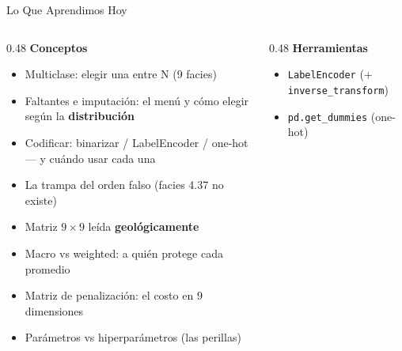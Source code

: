 \documentclass[aspectratio=169, 11pt]{beamer}
\begin{document}
\begin{frame}[shrink=8]{Lo Que Aprendimos Hoy}
  \vspace{-4pt}
  \begin{columns}[T]
    \begin{column}{0.48\textwidth}
      {\footnotesize\color{arcaDark}\bfseries Conceptos}
      \vspace{3pt}
      {\footnotesize\color{textMuted}
      \begin{itemize}\setlength{\itemsep}{2pt}
        \item[{\color{codeGreen}\scriptsize\faCheck}]
          Multiclase: elegir una entre N (9 facies)
        \item[{\color{codeGreen}\scriptsize\faCheck}]
          Faltantes e imputación: el menú y cómo elegir
          según la \textbf{distribución}
        \item[{\color{codeGreen}\scriptsize\faCheck}]
          Codificar: binarizar / LabelEncoder / one-hot ---
          y cuándo usar cada una
        \item[{\color{codeGreen}\scriptsize\faCheck}]
          La trampa del orden falso (facies 4.37 no existe)
        \item[{\color{codeGreen}\scriptsize\faCheck}]
          Matriz \(9\times9\) leída \textbf{geológicamente}
        \item[{\color{codeGreen}\scriptsize\faCheck}]
          Macro vs weighted: a quién protege cada promedio
        \item[{\color{codeGreen}\scriptsize\faCheck}]
          Matriz de penalización: el costo en 9 dimensiones
        \item[{\color{codeGreen}\scriptsize\faCheck}]
          Parámetros vs hiperparámetros (las perillas)
      \end{itemize}
      }
    \end{column}
    \begin{column}{0.48\textwidth}
      {\footnotesize\color{arcaDark}\bfseries Herramientas}
      \vspace{3pt}
      {\footnotesize\color{textMuted}
      \begin{itemize}\setlength{\itemsep}{2pt}
        \item[{\color{arcaRed}\scriptsize\faTools}]
          \texttt{LabelEncoder} (+ \texttt{inverse\_transform})
        \item[{\color{arcaRed}\scriptsize\faTools}]
          \texttt{pd.get\_dummies} (one-hot)

\end{itemize}}
\end{column}
\end{columns}
\end{frame}
\end{document}
